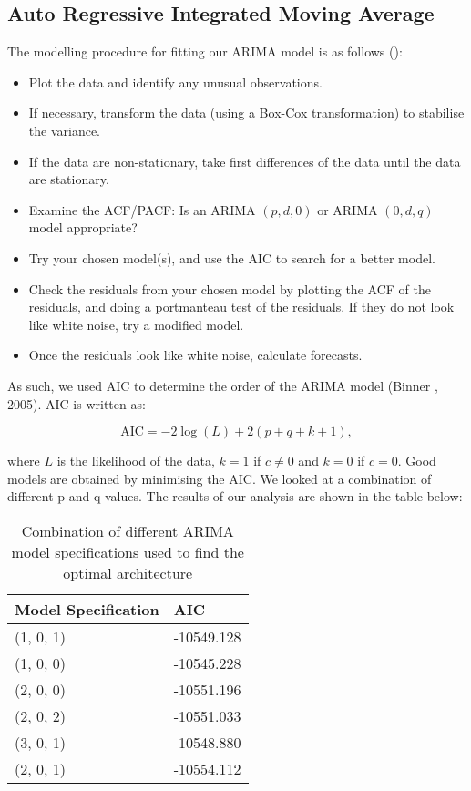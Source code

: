 \newpage
\subsection{Auto Regressive Integrated Moving Average}

The modelling procedure for fitting our ARIMA model is as follows (): 

\begin{itemize}
\item Plot the data and identify any unusual observations.
\item If necessary, transform the data (using a Box-Cox transformation) to stabilise the variance.
\item If the data are non-stationary, take first differences of the data until the data are stationary.
\item Examine the ACF/PACF: Is an ARIMA $(p, d, 0)$ or ARIMA $(0, d, q)$ model appropriate?
\item Try your chosen model(s), and use the AIC to search for a better model.
\item Check the residuals from your chosen model by plotting the ACF of the residuals, and doing a portmanteau test of the residuals. If they do not look like white noise, try a modified model.
\item Once the residuals look like white noise, calculate forecasts.
\end{itemize}

As such, we used AIC to determine the order of the ARIMA model (Binner , 2005). AIC is written as: 

\begin{equation}
\mathrm{AIC}=-2 \log (L)+2(p+q+k+1), 
\end{equation}

where $L$ is the likelihood of the data, $k=1$ if $c \neq 0$ and $k=0$ if $c=0$. Good models are obtained by minimising the AIC. 
We looked at a combination of different p and q values. The results of our analysis are shown in the table below:

\begin{table}[h]
\centering
\begin{tabular}{ll}
\hline
Model Specification & AIC        \\
\hline
(1, 0, 1)           & -10549.128 \\
(1, 0, 0)           & -10545.228 \\
(2, 0, 0)           & -10551.196 \\
(2, 0, 2)           & -10551.033 \\
(3, 0, 1)           & -10548.880 \\
(2, 0, 1)           & -10554.112 \\
\hline
\end{tabular}
\caption{Combination of different ARIMA model specifications used to find the optimal architecture}
\end{table}

